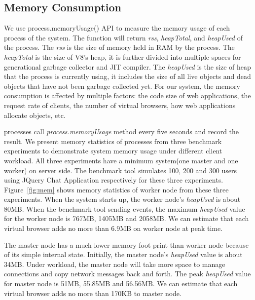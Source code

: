 \jquerychatlatency{}


\subsection{Memory Consumption}
We use \nodejs{} process.memoryUsage() API to measure the memory usage of each process
of the system.
The function will return \emph{rss}, \emph{heapTotal}, and \emph{heapUsed} of the process.
The \emph{rss} is the size of memory held in RAM by the process.
The \emph{heapTotal} is the size of V8's heap, it is further divided into 
multiple spaces for generational garbage collector and JIT compiler.
The \emph{heapUsed} is the size of heap that the process is currently using,
it includes the size of all live objects and dead objects that have not been garbage collected yet.
For our system, the memory consumption is affected by multiple factors:
the code size of web applications, the request rate of clients, 
the number of virtual browsers, how web applications allocate objects, etc.

\memfig{}

\cb{} processes call \emph{process.memoryUsage} method every five seconds and record
the result.
We present memory statistics of \cb{} processes from three benchmark experiments
 to demonstrate system memory usage under different client workload.
All three experiments have a minimum \cb{} system(one master and one worker) on server side.
The benchmark tool simulates 100, 200 and 300 users using JQuery Chat Application 
respectively for these three experiments.
Figure~\ref{fig:mem} shows memory statistics of worker node from these three experiments.
When the system starts up, the worker node's \emph{heapUsed} is about 80MB.
When the benchmark tool sending events,
the maximum \emph{heapUsed} value for the worker node is
767MB, 1405MB and 2058MB.
We can estimate that each virtual browser adds no more than 6.9MB on worker node 
at peak time.

The master node has a much lower memory foot print than worker node
because of its simple internal state.
Initially, the master node's \emph{heapUsed} value is about 34MB.
Under workload, the master node will take more space to manage connections and
copy network messages back and forth.
The peak \emph{heapUsed} value for master node is 51MB, 55.85MB and 56.56MB.
We can estimate that each virtual browser adds no more than 170KB to master node.

